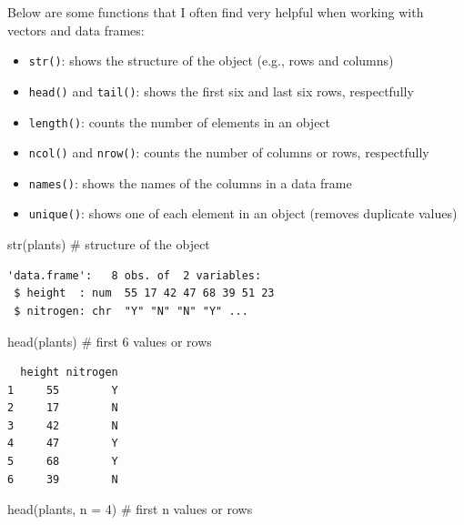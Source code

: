 \documentclass[
  letterpaper,
  DIV=11,
  numbers=noendperiod]{scrartcl}
\newenvironment{Shaded}{\begin{snugshade}}{\end{snugshade}}
\newcommand{\AttributeTok}[1]{\textcolor[rgb]{0.40,0.45,0.13}{#1}}
\newcommand{\CommentTok}[1]{\textcolor[rgb]{0.37,0.37,0.37}{#1}}
\newcommand{\DecValTok}[1]{\textcolor[rgb]{0.68,0.00,0.00}{#1}}
\newcommand{\FunctionTok}[1]{\textcolor[rgb]{0.28,0.35,0.67}{#1}}
\newcommand{\NormalTok}[1]{\textcolor[rgb]{0.00,0.23,0.31}{#1}}
\providecommand{\tightlist}{%
  \setlength{\itemsep}{0pt}\setlength{\parskip}{0pt}}
\begin{document}
Below are some functions that I often find very helpful when working
with vectors and data frames:

\begin{itemize}
\tightlist
\item
  \texttt{str()}: shows the structure of the object (e.g., rows and
  columns)
\item
  \texttt{head()} and \texttt{tail()}: shows the first six and last six
  rows, respectfully
\item
  \texttt{length()}: counts the number of elements in an object
\item
  \texttt{ncol()} and \texttt{nrow()}: counts the number of columns or
  rows, respectfully
\item
  \texttt{names()}: shows the names of the columns in a data frame
\item
  \texttt{unique()}: shows one of each element in an object (removes
  duplicate values)
\end{itemize}

\begin{Shaded}
\begin{Highlighting}[]
\FunctionTok{str}\NormalTok{(plants) }\CommentTok{\# structure of the object}
\end{Highlighting}
\end{Shaded}

\begin{verbatim}
'data.frame':   8 obs. of  2 variables:
 $ height  : num  55 17 42 47 68 39 51 23
 $ nitrogen: chr  "Y" "N" "N" "Y" ...
\end{verbatim}

\begin{Shaded}
\begin{Highlighting}[]
\FunctionTok{head}\NormalTok{(plants) }\CommentTok{\# first 6 values or rows}
\end{Highlighting}
\end{Shaded}

\begin{verbatim}
  height nitrogen
1     55        Y
2     17        N
3     42        N
4     47        Y
5     68        Y
6     39        N
\end{verbatim}

\begin{Shaded}
\begin{Highlighting}[]
\FunctionTok{head}\NormalTok{(plants, }\AttributeTok{n =} \DecValTok{4}\NormalTok{) }\CommentTok{\# first n values or rows}
\end{Highlighting}
\end{Shaded}
\end{document}
